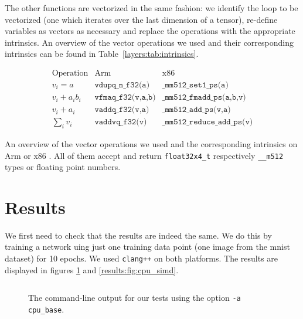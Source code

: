 \documentclass{article}
\numberwithin{equation}{section}
\numberwithin{figure}{section}
\numberwithin{table}{section}
\begin{document}
    The other functions are vectorized in the same fashion: we identify the loop to be vectorized (one which iterates over the
    last dimension of a tensor), re-define variables as vectors as necessary and replace the operations with the appropriate
    intrinsics. An overview of the vector operations we used and their corresponding intrinsics can be found in
    Table~\ref{layers:tab:intrinsics}.

    \begin{table}[htb]
        \begin{equation*}
            \begin{array}{c|c|c}
                \text{Operation} & \text{Arm} & \text{x86} \\ \hline
                v_i = a & \texttt{vdupq_n_f32(a)} & \texttt{_mm512_set1_ps(a)} \\
                v_i + a_ib_i & \texttt{vfmaq_f32(v,a,b)} & \texttt{_mm512_fmadd_ps(a,b,v)} \\
                v_i + a_i & \texttt{vaddq_f32(v,a)} & \texttt{_mm512_add_ps(v,a)} \\
                \sum_iv_i & \texttt{vaddvq_f32(v)} & \texttt{_mm512_reduce_add_ps(v)}
            \end{array}
        \end{equation*}
        \caption{An overview of the vector operations we used and the corresponding intrinsics on Arm or x86
        \cite{NEON:intrinsics,Intel:intrinsics}. All of them accept and return \texttt{float32x4_t} respectively
        \texttt{__m512} types or floating point numbers.}
        \label{layers:tab:intrinsics}
    \end{table}

    \FloatBarrier
    \section{Results}
    \label{sec:results}

    We first need to check that the results are indeed the same. We do this by training a network uing just one training
    data point (one image from the mnist dataset) for \num{10} epochs. We used \texttt{clang++} on both
    platforms. The results are displayed in figures \ref{results:fig:cpu_base} and \ref{results:fig:cpu_simd}.

    \begin{figure}[htb]
        \inputminted{shell-session}{21mnist/cmd_output/Arm_cpu_base.txt}
        \caption{The command-line output for our tests using the option \texttt{-a cpu_base}.}
        \label{results:fig:cpu_base}
    \end{figure}
\end{document}
